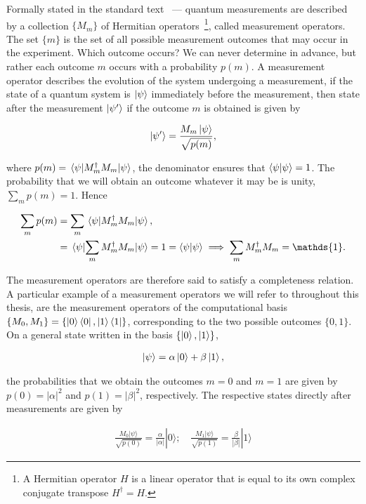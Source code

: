 \bigskip
\noindent
Formally stated in the standard text~\cite{Mike&Ike} --- quantum measurements are described by a collection $\{M_m\}$ of Hermitian operators~\footnote{A Hermitian operator $H$ is a linear operator that is equal to its own complex conjugate transpose $H^{\dagger} = H$.}, called measurement operators. The set $\{m\}$ is the set of all possible measurement outcomes that may occur in the experiment. Which outcome occurs? We can never determine in advance, but rather each outcome $m$ occurs with a probability $p(m)$. A measurement operator describes the evolution of the system undergoing a measurement, if the state of a quantum system is $\ket{\psi}$ immediately before the measurement, then state after the measurement $\ket{\psi'}$ if the outcome $m$ is obtained is given by

\begin{align}
	\ket{\psi'} = \frac{M_m\ket{\psi}}{\sqrt{p(m)}},
\end{align}

\noindent
where $p(m) = \ev{M^{\dagger}_m M_m}{\psi}$, the denominator ensures that $\ip{\psi}=1$. The probability that we will obtain an outcome whatever it may be is unity, \ie $\sum_{m} p(m) = 1$. Hence

\begin{align*}
	\displaystyle\sum_{m} p(m) &= \displaystyle\sum_{m} \ev{M_m^{\dagger}M_m}{\psi}, \\
											   &= \ev{\displaystyle\sum_{m} M_m^{\dagger}M_m}{\psi} = 1 = \ip{\psi} \implies \sum_{m}M^{\dagger}_m M_m = \mathds{1}.
\end{align*}

\clearpage
\noindent
The measurement operators are therefore said to satisfy a completeness relation. A particular example of a measurement operators we will refer to throughout this thesis, are the measurement operators of the computational basis $\{M_0, M_1\} = \{\ket{0}\bra{0}, \ket{1}\bra{1}\}$, corresponding to the two possible outcomes $\{0, 1\}$. On a general state written in the basis $\{\ket{0}, \ket{1}\}$,

\begin{align}
	\ket{\psi} = \alpha\ket{0} + \beta \ket{1},
\end{align}

\noindent
the probabilities that we obtain the outcomes $m=0$ and $m=1$ are given by $p(0) = |\alpha|^2$ and $p(1) = |\beta|^2$, respectively. The respective states directly after measurements are given by 

\begin{align*}
	\frac{M_0 |\psi\rangle}{\sqrt{p(0)}} = \frac{\alpha}{|\alpha|} |0\rangle; 
	\quad \frac{M_1 |\psi\rangle}{\sqrt{p(1)}} = \frac{\beta}{|\beta|} |1\rangle
\end{align*}

